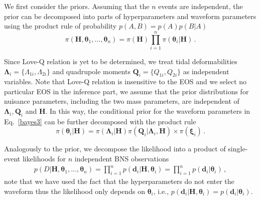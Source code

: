 \documentclass[a4paper,11pt]{article}
\begin{document}
We first consider the priors. Assuming that the $n$ events are independent, the 
prior can be decomposed into parts of hyperparameters and waveform parameters 
using the product rule of probability $p(A,B)=p(A)p(B|A)$
\begin{equation}
\label{bayes3}
\pi(\bm{H},\bm{\theta}_1,...,\bm{\theta}_n) = \pi(\bm{H}) \prod_{i=1}^n \pi(\bm{\theta}_i|\bm{H})\,.
\end{equation}

Since Love-Q relation is yet to be determined, we treat tidal deformabilities $\bm
{\Lambda}_i=\{\Lambda_{1i},\Lambda_{2i}\}$ and quadrupole moments $\bm{Q}_i=\{Q_
{1i},Q_{2i}\}$ as independent variables. Note that Love-Q relation is insensitive 
to the EOS and we select no particular EOS in the inference part, we assume that 
the prior distributions for nuisance parameters, including the two mass 
parameters, are independent of $\bm{\Lambda}_i, \bm{Q}_i$ and $\bm{H}$. 
In this way, the conditional prior for the waveform parameters in Eq.~\eqref{bayes3} can be further decomposed with the product rule
\begin{equation}
\label{prior}
\pi(\bm{\theta}_i|\bm{H})=\pi(\bm{\Lambda}_i|\bm{H})\pi(\bm{Q}_i|\bm{\Lambda}_i,\bm{H})\times\pi(\bm{\xi}_i)\,.
\end{equation}

Analogously to the prior, we decompose the likelihood into a product of 
single-event likelihoods for $n$ independent BNS observations
\begin{subequations}
\begin{align}
p(D|\bm{H},\bm{\theta}_1,...,\bm{\theta}_n)=\prod_{i=1}^{n}p(\bm{d}_i|\bm{H},\bm{\theta}_i)=\prod_{i=1}^{n}p(\bm{d}_i|\bm{\theta}_i)\,,
\end{align}   
\end{subequations}
note that we have used the fact that the hyperparameters do not enter the waveform 
thus the likelihood only depends on $\bm{\theta}_i$, i.e., $p(\bm{d}_i|\bm{H},\bm{\theta}_i)=p(\bm{d}_i|\bm{\theta}_i)$.
\end{document}
